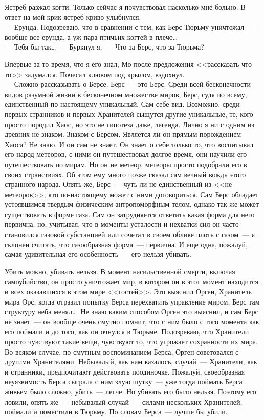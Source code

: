 Ястреб разжал когти. Только сейчас я почувствовал насколько мне больно. В ответ 
на мой крик ястреб криво улыбнулся.\\
--- Ерунда. Подозреваю, что в сравнении с тем, как Берс Тюрьму уничтожал~--- 
вообще все ерунда, а уж пара птичьих когтей в плечо\ldots\\
--- Тебя бы так\ldots~--- Буркнул я.~--- Что за Берс, что за Тюрьма?


Впервые за то время, что я его знал, Мо после предложения <<рассказать что-то>> 
задумался. Почесал клювом под крылом, вздохнул.\\
--- Сложно рассказывать о Берсе. Берс~--- это Берс. Среди всей бесконечности 
видов разумной жизни в бесконечном множестве миров, Берс, судя по всему, единственный 
по-настоящему уникальный. Сам себе вид. Возможно, среди первых странников и 
первых Хранителей сыщутся другие уникальные, те, кого просто породил Хаос, но 
это не гипотеза даже, легенда. Лично я ни с одним из древних не знаком. Знаком 
с Берсом. Является ли он прямым порождением Хаоса? Не знаю. И он сам не знает. Он 
знает о себе только то, что воспитывал его народ метеоров, с ними он 
путешествовал долгое время, они научили его путешествовать по мирам. Но он не 
метеор, метеоры просто подобрали его в своих странствиях. Об этом ему много 
позже сказал сам вечный вождь этого странного народа. Опять же, Берс~--- чуть 
ли не единственный из <<не--метеоров>>, кто по-настоящему может с ними 
договориться. 
Сам Берс обладает устоявшимся твердым физическим антропоморфным телом, однако 
так же может существовать в форме газа. Сам он затрудняется ответить какая 
форма для него первична, но, учитывая, что в моменты усталости и нехватки сил он 
часто становился газовой субстанцией или сочетал в своем облике плоть с газом~--- я 
склонен считать, что газообразная форма~--- первична. И еще одна, пожалуй, 
самая удивительная его особенность~--- его нельзя убивать.

Убить можно, убивать нельзя. В момент насильственной смерти, включая 
самоубийство, он просто уничтожает мир, в котором он в этот момент находится и 
всех оказавшихся в этом мире <<гостей>>. Это выяснил Орген, Хранитель мира Орс, 
когда отразил попытку Берса перехватить управление миром, Берс там структуру 
неба менял\ldots\ Не знаю каким способом Орген это выяснил, и сам Берс не знает~--- 
он вообще очень смутно помнит, что с ним было с того момента как его поймали и до 
того, как он очнулся в Тюрьме. Подозреваю, что Хранители просто чувствуют такие 
вещи, чувствуют то, что угрожает сохранности их мира. Во всяком случае, по 
смутным воспоминанием Берса, Орген советовался с другими Хранителями. 
Небывалый, как нам казалось, случай~--- Хранители, как и странники, предпочитают 
действовать поодиночке. Пожалуй, своеобразная неуязвимость Берса сыграла с ним злую 
шутку~--- уже тогда поймать Берса живьем было сложно, убить~--- легче. Но убивать его 
было нельзя. Поэтому его ловили, опять же~--- небывалый случай~--- силами нескольких 
Хранителей, поймали и поместили в Тюрьму. По словам Берса~--- лучше бы убили.


